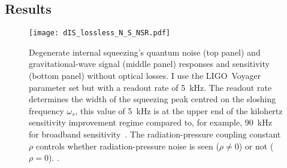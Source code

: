 \begin{comment}
Inspecting $\text{T}\begin{bsmallmatrix}1 \\1\end{bsmallmatrix}$, i.e.\ the vector of signal transfer functions to each quadrature, shows that there are two terms: (1) rotates between the quadratures with the pump phase and (2) stays in the second quadrature and never vanishes with the pump phase \jam{(is it worth showing this?)}. I consider measuring the second quadrature at the photodetector since the signal is always there~\footnote{This does not mean that it is necessarily optimal to do so since the profile of the noise between the two quadratures is different to the signal, but it will suffice here~\cite{}. \jam{(What happens if I use $\phi=\pi$ and observe the first quadrature instead?)}}, and therefore the sensitivity ($\sqrt{S_h}$ is the noise-to-signal ratio) is
\begin{equation}
S_h = \frac{(\text{S}_X)_{2,2}}{\abs{(\text{T}\begin{bsmallmatrix}1 \\1\end{bsmallmatrix})_2}^2}.
\end{equation}
\end{comment}


\subsection{Results}
\label{sec:dIS_results}

\begin{figure}
	\centering
	\texttt{[image: dIS\_lossless\_N\_S\_NSR.pdf]}
	\caption{ Degenerate internal squeezing's quantum noise (top panel) and gravitational-wave signal (middle panel) responses and sensitivity (bottom panel) without optical losses. I use the LIGO~Voyager parameter set but with a readout rate of 5~kHz. The readout rate determines the width of the squeezing peak centred on the sloshing frequency $\omega_s$, this value of 5~kHz is at the upper end of the kilohertz sensitivity improvement regime compared to, for example, 90~kHz for broadband sensitivity~\cite{korobkoQuantumExpanderGravitationalwave2019}. The radiation-pressure coupling constant $\rho$ controls whether radiation-pressure noise is seen ($\rho\neq0$) or not ($\rho=0$). .}
	\label{fig:dIS_sensitivity}
\end{figure}

